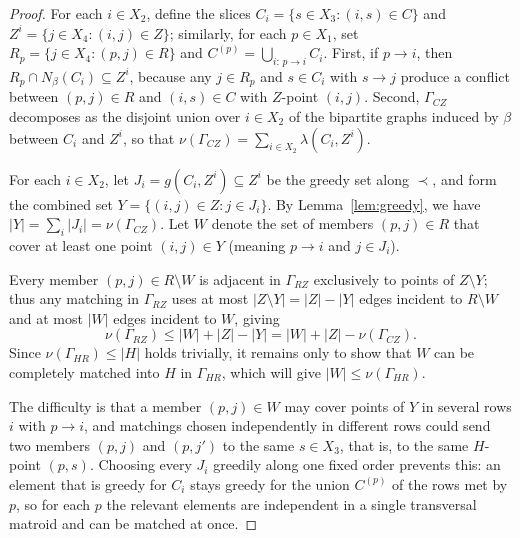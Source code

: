\documentclass[11pt]{amsart}
\theoremstyle{remark}
\newcommand{\abs}[1]{\lvert #1\rvert}
\begin{document}
\begin{proof}
For each $i\in X_2$, define the slices $C_i=\{s\in X_3:(i,s)\in C\}$ and $Z^i=\{j\in X_4:(i,j)\in Z\}$; similarly, for each $p\in X_1$, set $R_p=\{j\in X_4:(p,j)\in R\}$ and $C^{(p)}=\bigcup_{i:\,p\to i}C_i$. First, if $p\to i$, then $R_p\cap N_\beta(C_i)\subseteq Z^i$, because any $j\in R_p$ and $s\in C_i$ with $s\to j$ produce a conflict between $(p,j)\in R$ and $(i,s)\in C$ with $Z$-point $(i,j)$. Second, $\Gamma_{CZ}$ decomposes as the disjoint union over $i\in X_2$ of the bipartite graphs induced by $\beta$ between $C_i$ and $Z^i$, so that $\nu(\Gamma_{CZ})=\sum_{i\in X_2}\lambda(C_i,Z^i)$.

For each $i\in X_2$, let $J_i=g(C_i,Z^i)\subseteq Z^i$ be the greedy set along $\prec$, and form the combined set $Y=\{(i,j)\in Z:j\in J_i\}$. By Lemma~\ref{lem:greedy}, we have $\abs Y=\sum_i\abs{J_i}=\nu(\Gamma_{CZ})$. Let $W$ denote the set of members $(p,j)\in R$ that cover at least one point $(i,j)\in Y$ (meaning $p\to i$ and $j\in J_i$).

Every member $(p,j)\in R\setminus W$ is adjacent in $\Gamma_{RZ}$ exclusively to points of $Z\setminus Y$; thus any matching in $\Gamma_{RZ}$ uses at most $\abs{Z\setminus Y}=\abs Z-\abs Y$ edges incident to $R\setminus W$ and at most $\abs W$ edges incident to $W$, giving
\[
  \nu(\Gamma_{RZ})\le\abs W+\abs Z-\abs Y=\abs W+\abs Z-\nu(\Gamma_{CZ}).
\]
Since $\nu(\Gamma_{HR})\le\abs H$ holds trivially, it remains only to show that $W$ can be completely matched into $H$ in $\Gamma_{HR}$, which will give $\abs W\le\nu(\Gamma_{HR})$.

The difficulty is that a member $(p,j)\in W$ may cover points of $Y$ in several rows $i$ with $p\to i$, and matchings chosen independently in different rows could send two members $(p,j)$ and $(p,j')$ to the same $s\in X_3$, that is, to the same $H$-point $(p,s)$. Choosing every $J_i$ greedily along one fixed order prevents this: an element that is greedy for $C_i$ stays greedy for the union $C^{(p)}$ of the rows met by $p$, so for each $p$ the relevant elements are independent in a single transversal matroid and can be matched at once.


\end{proof}
\end{document}
